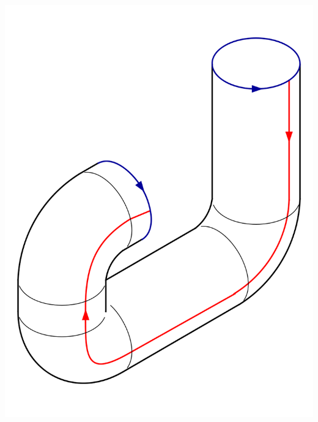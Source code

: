 \begin{example}
\begin{enumerate}[1)]
\begin{minipage}{\textwidth}
\begin{minipage}{0.3\textwidth}
                    \includegraphics[width=\textwidth]{figures/800px-Klein_Bottle_Folding_4.svg.png}
                \end{minipage}
                \begin{minipage}{0.3\textwidth}

\end{minipage}
\end{minipage}
\end{enumerate}
\end{example}
